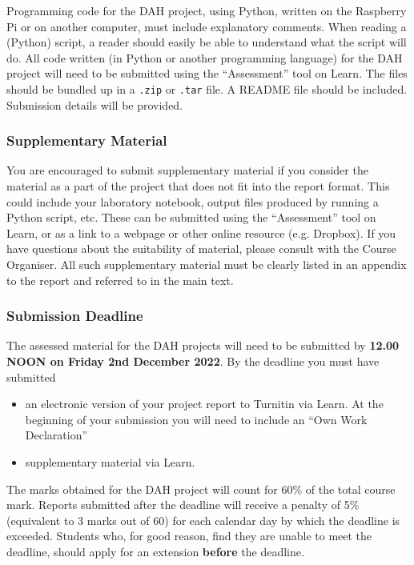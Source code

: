 Programming code for the DAH project, using Python, written on the Raspberry Pi or on another computer, must include explanatory comments.
When reading a (Python) script, a reader should easily be able to understand what the script will do.
All code written (in Python or another programming language) for the DAH project will need to be submitted using the ``Assessment'' tool on Learn.
The files should be bundled up in a \texttt{.zip} or \texttt{.tar} file.
A README file should be included.
Submission details will be provided.

\subsubsection{Supplementary Material}

You are encouraged to submit supplementary material if you consider the material as a part of the project that does not fit into the report format. 
This could include your laboratory notebook, output files produced by running a Python script, etc.
These can be submitted using the ``Assessment'' tool on Learn, or as a link to a webpage or other online resource (e.g. Dropbox).
If you have questions about the suitability of material, please consult with the Course Organiser.
All such supplementary material must be clearly listed in an appendix to the report and referred to in the main text. 

\subsubsection{Submission Deadline}

The assessed material for the DAH projects will need to be submitted by {\bf 12.00 NOON on Friday 2nd December 2022}.
By the deadline you must have submitted
\begin{itemize}
\item an electronic version of your project report to Turnitin via Learn. At the beginning of your submission you will need to include an ``Own Work Declaration''
\item supplementary material via Learn. %
\end{itemize}
The marks obtained for the DAH project will count for 60\% of the total course mark.
Reports submitted after the deadline will receive a penalty of 5\% (equivalent to 3 marks out of 60) for each calendar day by which the deadline is exceeded.
Students who, for good reason, find they are unable to meet the deadline, should apply for an extension {\bf before} the deadline.

